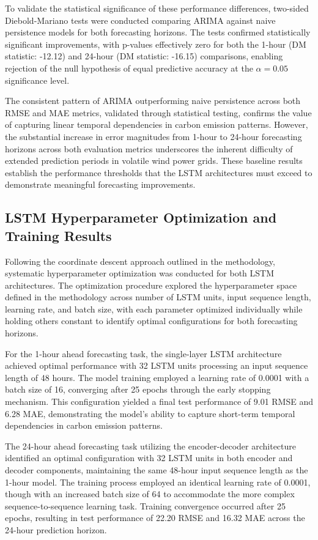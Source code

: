To validate the statistical significance of these performance differences, two-sided Diebold-Mariano tests were conducted comparing ARIMA against naive persistence models for both forecasting horizons. The tests confirmed statistically significant improvements, with p-values effectively zero for both the 1-hour (DM statistic: -12.12) and 24-hour (DM statistic: -16.15) comparisons, enabling rejection of the null hypothesis of equal predictive accuracy at the \(\alpha = 0.05\) significance level.

The consistent pattern of ARIMA outperforming naive persistence across both RMSE and MAE metrics, validated through statistical testing, confirms the value of capturing linear temporal dependencies in carbon emission patterns. However, the substantial increase in error magnitudes from 1-hour to 24-hour forecasting horizons across both evaluation metrics underscores the inherent difficulty of extended prediction periods in volatile wind power grids. These baseline results establish the performance thresholds that the LSTM architectures must exceed to demonstrate meaningful forecasting improvements.

\subsection{LSTM Hyperparameter Optimization and Training Results}

Following the coordinate descent approach outlined in the methodology, systematic hyperparameter optimization was conducted for both LSTM architectures. The optimization procedure explored the hyperparameter space defined in the methodology across number of LSTM units, input sequence length, learning rate, and batch size, with each parameter optimized individually while holding others constant to identify optimal configurations for both forecasting horizons.

For the 1-hour ahead forecasting task, the single-layer LSTM architecture achieved optimal performance with 32 LSTM units processing an input sequence length of 48 hours. The model training employed a learning rate of 0.0001 with a batch size of 16, converging after 25 epochs through the early stopping mechanism. This configuration yielded a final test performance of 9.01 RMSE and 6.28 MAE, demonstrating the model's ability to capture short-term temporal dependencies in carbon emission patterns.

The 24-hour ahead forecasting task utilizing the encoder-decoder architecture identified an optimal configuration with 32 LSTM units in both encoder and decoder components, maintaining the same 48-hour input sequence length as the 1-hour model. The training process employed an identical learning rate of 0.0001, though with an increased batch size of 64 to accommodate the more complex sequence-to-sequence learning task. Training convergence occurred after 25 epochs, resulting in test performance of 22.20 RMSE and 16.32 MAE across the 24-hour prediction horizon.

